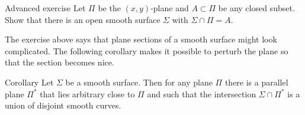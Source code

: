 \begin{thm}{Advanced exercise}\label{ex:plane-section}
Let $\Pi$ be the $(x,y)$-plane and $A \subset \Pi$ be any closed subset. Show that there is an open smooth surface $\Sigma$ with $\Sigma \cap \Pi = A$.
\end{thm}

The exercise above says that plane sections of a smooth surface might look complicated.
The following corollary makes it possible to perturb the plane so that the section becomes nice.

\begin{thm}{Corollary}
Let $\Sigma$ be a smooth surface.
Then for any plane $\Pi$ there is a parallel plane $\Pi^{*}$ that lies arbitrary close to $\Pi$ and such that the intersection $\Sigma\cap\Pi^{*}$ is a union of disjoint smooth curves.
\end{thm}



